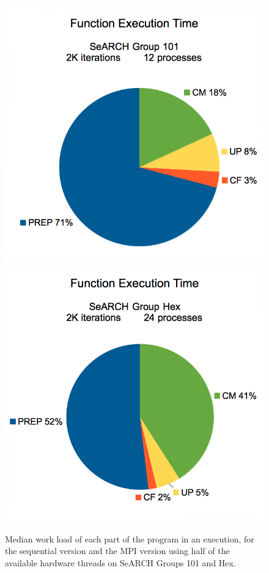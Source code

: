 \begin{figure}[!p]
\begin{center}
		\includegraphics[width=\columnwidth]{report.may/images/load12101.png}
		\includegraphics[width=\columnwidth]{report.may/images/load24hex.png}
	\end{center}
	\caption[Work loads]{Median work load of each part of the program in an execution, for the sequential version and the MPI version using half of the available hardware threads on SeARCH Groups 101 and Hex.}
	\label{fig:load1}
\end{figure}

